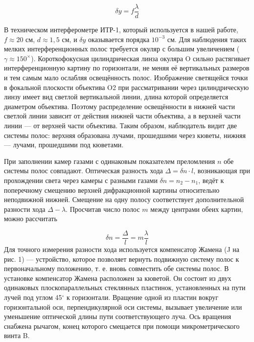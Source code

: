 \begin{equation}
	\delta y = f \frac{\lambda}{d}
\end{equation}

	В техническом интерферометре ИТР-1, который используется в нашей работе, $f \approx 20$ см, $d \approx 1,5$ см, и $\delta y$ оказывается порядка $10^{-3}$ см. Для наблюдения таких мелких интерференционных полос требуется окуляр с большим увеличением ($\gamma \approx 150^\times$). Короткофокусная цилиндрическая линза окуляра O сильно растягивает интерференционную картину по горизонтали, не меняя её вертикальных размеров и тем самым мало ослабляя освещённость полос. Изображение светящейся точки в фокальной плоскости объектива O2 при рассматривании через цилиндрическую линзу имеет вид светлой вертикальной линии, длина которой определяется диаметром объектива. Поэтому распределение освещённости в нижней части светлой линии зависит от действия нижней части объектива, а в верхней части линии — от верхней части объектива. Таким образом, наблюдатель видит две системы полос: верхняя образована лучами, прошедшими через кюветы, нижняя — лучами, прошедшими под кюветами.

	При заполнении камер газами с одинаковым показателем преломления $n$ обе системы полос совпадают. Оптическая разность хода $\Delta = \delta n \cdot l$, возникающая при прохождении света через камеры с разными газами $\delta n = n_2 - n_1$, ведёт к поперечному смещению верхней дифракционной картины относительно неподвижной нижней. Смещение на одну полосу соответствует дополнительной разности хода $\Delta - \lambda$. Просчитав число полос $m$ между центрами обеих картин, можно рассчитать

\begin{equation}
\delta n = \frac{\Delta}{l} = m\frac{\lambda}{l}
\label{delta_n}
\end{equation}
Для точного измерения разности хода используется компенсатор Жамена (J на рис. 1) — устройство, которое позволяет вернуть подвижную систему полос к первоначальному положению, т. е. вновь совместить обе системы полос. В установке компенсатор Жамена расположен за кюветой. Он состоит из двух одинаковых плоскопараллельных стеклянных пластинок, установленных на пути лучей под углом 45$^\circ$ к горизонтали. Вращение одной из пластин вокруг горизонтальной оси, перпендикулярной оси системы, вызывает увеличение или уменьшение оптической длины пути соответствующего луча. Ось вращения снабжена рычагом, конец которого смещается при помощи микрометрического винта B.

